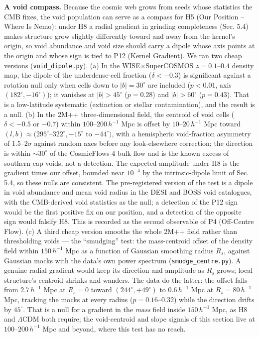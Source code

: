 \documentclass[
  11pt,
]{article}
\begin{document}
\textbf{A void compass.} Because the cosmic web grows from seeds whose
statistics the CMB fixes, the void population can serve as a compass for
H5 (Our Position -- Where Is Nemo): under H8 a radial gradient in
grinding completeness (Sec. 5.4) makes structure grow slightly
differently toward and away from the kernel's origin, so void abundance
and void size should carry a dipole whose axis points at the origin and
whose sign is tied to P12 (Kernel Gradient). We ran two cheap versions
(\texttt{void\_dipole.py}). (a) In the WISE\(\times\)SuperCOSMOS
\(z = 0.1\)--\(0.4\) density map, the dipole of the underdense-cell
fraction (\(\delta < -0.3\)) is significant against a rotation null only
when cells down to \(|b| = 30^\circ\) are included (\(p < 0.01\), axis
\((182^\circ, -16^\circ)\)); it vanishes at \(|b| > 45^\circ\)
(\(p = 0.28\)) and \(|b| > 60^\circ\) (\(p = 0.43\)). That is a
low-latitude systematic (extinction or stellar contamination), and the
result is a null. (b) In the 2M++ three-dimensional field, the centroid
of void cells (\(\delta < -0.5\) or \(-0.7\)) within
\(100\)--\(200\,h^{-1}\) Mpc is offset by \(10\)--\(20\,h^{-1}\) Mpc
toward \((l,b) \approx (295^\circ\)--\(322^\circ, -15^\circ\) to
\(-44^\circ)\), with a hemispheric void-fraction asymmetry of
\(1.5\)--\(2\sigma\) against random axes before any look-elsewhere
correction; the direction is within \(\sim 30^\circ\) of the
CosmicFlows-4 bulk flow and is the known excess of southern-cap voids,
not a detection. The expected amplitude under H8 is the gradient times
our offset, bounded near \(10^{-4}\) by the intrinsic-dipole limit of
Sec. 5.4, so these nulls are consistent. The pre-registered version of
the test is a dipole in void abundance and mean void radius in the DESI
and BOSS void catalogues, with the CMB-derived void statistics as the
null; a detection of the P12 sign would be the first positive fix on our
position, and a detection of the opposite sign would falsify H8. This is
recorded as the second observable of P4 (Off-Centre Flow). (c) A third
cheap version smooths the whole 2M++ field rather than thresholding
voids --- the ``smudging'' test: the mass-centroid offset of the density
field within \(150\,h^{-1}\) Mpc as a function of Gaussian smoothing
radius \(R_s\), against Gaussian mocks with the data's own power
spectrum (\texttt{smudge\_centre.py}). A genuine radial gradient would
keep its direction and amplitude as \(R_s\) grows; local structure's
centroid shrinks and wanders. The data do the latter: the offset falls
from \(2.7\,h^{-1}\) Mpc at \(R_s = 0\) toward
\((244^\circ, +49^\circ)\) to \(0.6\,h^{-1}\) Mpc at
\(R_s = 80\,h^{-1}\) Mpc, tracking the mocks at every radius
(\(p = 0.16\)--\(0.32\)) while the direction drifts by \(45^\circ\).
That is a null for a gradient in the \emph{mass} field inside
\(150\,h^{-1}\) Mpc, as H8 and \(\Lambda\)CDM both require; the
void-centroid and slope signals of this section live at
\(100\)--\(200\,h^{-1}\) Mpc and beyond, where this test has no reach.
\end{document}
